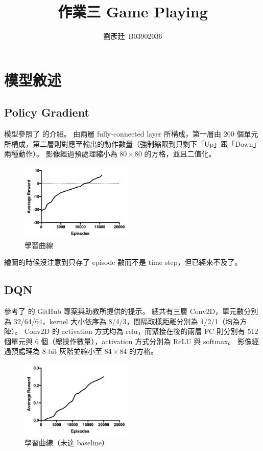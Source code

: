 \documentclass[final,3p]{elsarticle}
\begin{document}
\begin{frontmatter}

\title{作業三 Game Playing}

\author{劉彥廷~B03902036}

\end{frontmatter}


\section{模型敘述}
\subsection{Policy Gradient}
	模型參照了 \cite{DeepRein18:online} 的介紹。
	由兩層 fully-connected layer 所構成，第一層由 200 個單元所構成，第二層則對應至輸出的動作數量（強制縮限到只剩下「Up」跟「Down」兩種動作）。
	影像經過預處理縮小為 $80 \times 80$ 的方格，並且二值化。
	
	\begin{figure}[H]
		\centering
		\includegraphics[width=0.48\textwidth]{images/pg_curve}
		\caption{學習曲線} \label{fig:pg_curve}
	\end{figure}
	
	繪圖的時候沒注意到只存了 episode 數而不是 time step，但已經來不及了。
	
\subsection{DQN}
	參考了 \cite{tokb23dq42:online} 的 GitHub 專案與助教所提供的提示。
	總共有三層 Conv2D，單元數分別為 32/64/64，kernel 大小依序為 8/4/3，間隔取樣距離分別為 4/2/1（均為方陣）。
	Conv2D 的 activation 方式均為 relu，而緊接在後的兩層 FC 則分別有 512 個單元與 6 個（總操作數量），activation 方式分別為 ReLU 與 softmax。
	影像經過預處理為 8-bit 灰階並縮小至 $84 \times 84$ 的方格。
	
	\begin{figure}[H]
		\centering
		\includegraphics[width=0.48\textwidth]{images/dqn_curve}
		\caption{學習曲線（未達 baseline）} \label{fig:dqn_curve}
	\end{figure}
	
\end{document}
